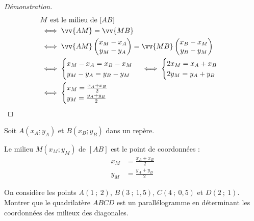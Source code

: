 \begin{proof}[Démonstration]\hfill 
	\begin{align*}
		&\text{$M$ est le milieu de $[AB]$} \\
		& \iff \vv{AM}=\vv{MB} \\
		& \iff \vv{AM}\begin{pmatrix}
			x_M-x_A \\ y_M-y_A
		\end{pmatrix}=\vv{MB}\begin{pmatrix}
			x_B-x_M\\ y_B-y_M
		\end{pmatrix} \\
		& \iff \begin{cases}
			x_M-x_A = x_B-x_M  \\  y_M-y_A = y_B-y_M
		\end{cases} 
		\iff \begin{cases}
			2x_M = x_A + x_B  \\ 2y_M = y_A + y_B
		\end{cases} \\
		& \iff \begin{cases}
			x_M =\frac{x_A+x_B}{2} \\ y_M =\frac{y_A+y_B}{2}
		\end{cases}  
	\end{align*} 
\end{proof} 
\begin{theorem}
	Soit $A(x_A;y_A)$ et $B(x_B;y_B)$ dans un repère.
	
	Le milieu $M(x_M;y_M)$ de $[AB]$ est le point de coordonnées :
	\begin{align*}
		x_M&=\frac{x_A+x_B}{2}\\
		y_M&=\frac{y_A+y_B}{2}
	\end{align*}
\end{theorem} 


\begin{example}
	On considère les points $A(1~;~2)$, $B(3~;~1,5)$, $C(4~;~0,5)$ et $D(2~;~1)$.  
	Montrer que le quadrilatère $ABCD$ est un parallélogramme en déterminant les coordonnées des milieux des diagonales.
\end{example}
\vfill 


%	 
